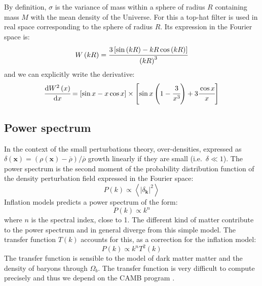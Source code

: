 By definition, $\sigma$ is the variance of mass within a sphere of radius
$R$ containing mass $M$ with the mean density of the Universe. For this a
top-hat filter is used in real space corresponding to the sphere of radius
$R$. Its expression in the Fourier space is:
%
\begin{equation}
    W \left(kR\right) =
    \cfrac{3\left[\sin\left(kR\right) - kR \cos \left(kR\right)\right]}
    {{\left(kR\right)}^3}
\end{equation}
%
and we can explicitly write the derivative:
%
\begin{equation}
    \cfrac{{\rm{d}} W^2 \left(x\right)}{{\rm{d}} x} = \left[\sin x - x\cos x\right]
    \times \left[\sin x \left(1 - \cfrac{3}{x^3}\right) + 3\cfrac{\cos
    x}{x}\right]
\end{equation}

\subsection{Power spectrum}
\label{sub:power_spectrum}

In the context of the small perturbations theory, over-densities, expressed
as $\delta \left(\textbf{x}\right) = \left(\rho \left(\textbf{x}\right) -
\overline\rho\right) / \overline\rho$ growth linearly if they are small
(i.e.\ $\delta\ll1$). The power spectrum is the second moment of the
probability distribution function of the density perturbation field
expressed in the Fourier space:
%
\begin{equation}
    P \left(k\right) \propto
    \left\langle{\left|\delta_\textbf{k}\right|}^2\right\rangle
\end{equation}
%
Inflation models predicts a power spectrum of the form:
%
\begin{equation}
    P \left(k\right) \propto k^n
\end{equation}
%
where $n$ is the spectral index, close to 1. The different kind of matter
contribute to the power spectrum and in general diverge from this simple
model. The transfer function $T \left(k\right)$ accounts for this, as a
correction for the inflation model:
%
\begin{equation}
    P \left(k\right) \propto k^n T^2 \left(k\right)
\end{equation}
%
The transfer function is sensible to the model of dark matter matter and the
density of baryons through $\Omega_b$. The transfer function is very difficult
to compute precisely and thus we depend on the CAMB program \citep{Lewis+00}.

